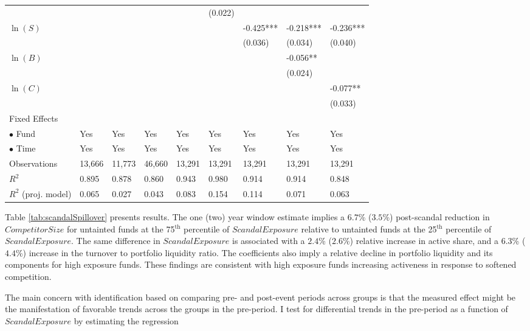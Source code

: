 \documentclass[openany]{book}
\theoremstyle{definition}
\theoremstyle{definition}
\theoremstyle{definition}
\theoremstyle{remark}
\begin{document}
\begin{table}[ht]
\begin{tabularx}{0.975\textwidth}{lYYYYYYYY}
   &  &  &  &  & (0.022) &  &  &  \\ 
  $\ln(S)$ &  &  &  &  &  & -0.425*** & -0.218*** & -0.236*** \\ 
   &  &  &  &  &  & (0.036) & (0.034) & (0.040) \\ 
  $\ln(B)$ &  &  &  &  &  &  & -0.056** &  \\ 
   &  &  &  &  &  &  & (0.024) &  \\ 
  $\ln(C)$ &  &  &  &  &  &  &  & -0.077** \\ 
   &  &  &  &  &  &  &  & (0.033) \\ 
  Fixed Effects &  &  &  &  &  &  &  &  \\ 
  $\bullet$ Fund & Yes & Yes & Yes & Yes & Yes & Yes & Yes & Yes \\ 
  $\bullet$ Time & Yes & Yes & Yes & Yes & Yes & Yes & Yes & Yes \\ 
  Observations & 13,666 & 11,773 & 46,660 & 13,291 & 13,291 & 13,291 & 13,291 & 13,291 \\ 
  $R^2$ & 0.895 & 0.878 & 0.860 & 0.943 & 0.980 & 0.914 & 0.914 & 0.848 \\ 
  $R^2$ (proj. model) & 0.065 & 0.027 & 0.043 & 0.083 & 0.154 & 0.114 & 0.071 & 0.063 \\ 
   \bottomrule
\end{tabularx}
\endgroup
\end{table}

Table \ref{tab:scandalSpillover} presents results. The one (two) year
window estimate implies a \(6.7\)\% (\(3.5\)\%) post-scandal reduction
in \(CompetitorSize\) for untainted funds at the 75\(^{\text{th}}\)
percentile of \(ScandalExposure\) relative to untainted funds at the
25\(^{\text{th}}\) percentile of \(ScandalExposure\). The same
difference in \(ScandalExposure\) is associated with a \(2.4\)\%
(\(2.6\)\%) relative increase in active share, and a \(6.3\)\%
(\(4.4\)\%) increase in the turnover to portfolio liquidity ratio. The
coefficients also imply a relative decline in portfolio liquidity and
its components for high exposure funds. These findings are consistent
with high exposure funds increasing activeness in response to softened
competition.

The main concern with identification based on comparing pre- and
post-event periods across groups is that the measured effect might be
the manifestation of favorable trends across the groups in the
pre-period. I test for differential trends in the pre-period as a
function of \(ScandalExposure\) by estimating the regression
\end{document}
